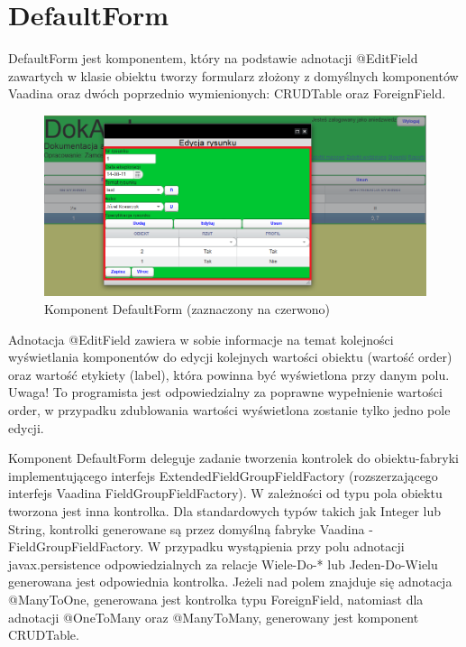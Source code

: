 \section{DefaultForm}
DefaultForm jest komponentem, który na podstawie adnotacji @EditField zawartych w klasie obiektu tworzy formularz złożony z domyślnych komponentów Vaadina oraz dwóch poprzednio wymienionych: CRUDTable oraz ForeignField. 

\newpage
\begin{figure} [H]
    \begin{center}
	\includegraphics[scale=.6]{img/formField.png}
	\caption{Komponent DefaultForm (zaznaczony na czerwono)}
	\label{defaultForm}
    \end{center}
\end{figure}

Adnotacja @EditField zawiera w sobie informacje na temat kolejności wyświetlania komponentów do edycji kolejnych wartości obiektu (wartość order) oraz wartość etykiety (label), która powinna być wyświetlona przy danym polu. Uwaga! To programista jest odpowiedzialny za poprawne wypełnienie wartości order, w przypadku zdublowania wartości wyświetlona zostanie tylko jedno pole edycji.

Komponent DefaultForm deleguje zadanie tworzenia kontrolek do obiektu-fabryki implementującego interfejs ExtendedFieldGroupFieldFactory (rozszerzającego interfejs Vaadina FieldGroupFieldFactory). W zależności od typu pola obiektu tworzona jest inna kontrolka. Dla standardowych typów takich jak Integer lub String, kontrolki generowane są przez domyślną fabryke Vaadina - FieldGroupFieldFactory. W przypadku wystąpienia przy polu adnotacji javax.persistence odpowiedzialnych za relacje Wiele-Do-* lub Jeden-Do-Wielu generowana jest odpowiednia kontrolka. Jeżeli nad polem znajduje się adnotacja @ManyToOne, generowana jest kontrolka typu ForeignField, natomiast dla adnotacji @OneToMany oraz @ManyToMany, generowany jest komponent CRUDTable.

